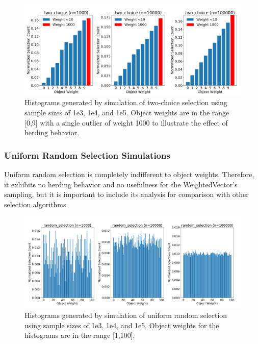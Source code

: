 \documentclass[12pt]{article}
\begin{document}
    \begin{figure}[h]
      \centering
      \includegraphics[scale=0.32]{images/pathological_two_choice.png} 
      \caption{Histograms generated by simulation of two-choice selection
               using sample sizes of 1e3, 1e4, and 1e5. Object weights are in
               the range [0,9] with a single outlier of weight 1000 to
               illustrate the effect of herding behavior.}
      \label{fig:pathological_two_choice}
    \end{figure}

    \subsubsection{Uniform Random Selection Simulations}
    Uniform random selection is completely indifferent to object weights.
    Therefore, it exhibits no herding behavior and no usefulness for the
    WeightedVector's sampling, but it is important to include its analysis for
    comparison with other selection algorithms.

    \begin{figure}[h]
      \centering
      \includegraphics[scale=0.32]{images/herding_random.png} 
      \caption{Histograms generated by simulation of uniform random selection
               using sample sizes of 1e3, 1e4, and 1e5. Object weights
               for the histograms are in the range [1,100].}
      \label{fig:herding_random}
    \end{figure}
\end{document}
